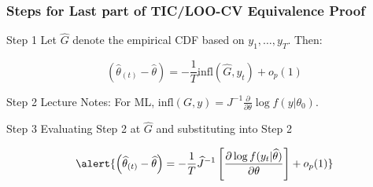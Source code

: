 \begin{frame}
  \frametitle{Steps for Last part of TIC/LOO-CV Equivalence Proof} 
 

  \begin{block}{Step 1}
    Let $\widehat{G}$ denote the empirical CDF based on $y_1, \dots, y_T$. Then:
    \vspace{-1em}

   \[
     \left( \widehat{\theta}_{(t)} - \widehat{\theta} \right) = -\frac{1}{T} \text{infl}(\widehat{G}, y_t) + o_p(1)
   \]
  \end{block}

  \vspace{-1em}

  \begin{block}{Step 2}
    Lecture Notes: For ML, $\text{infl}(G,y) = J^{-1} \frac{\partial}{\partial \theta}\log f(y|\theta_0)$. 
  \end{block}



  \begin{block}{Step 3}
    Evaluating Step 2 at $\widehat{G}$ and substituting into Step 2

    \vspace{-1em}

\[
  \alert{\left( \widehat{\theta}_{(t)} - \widehat{\theta}  \right) = -\frac{1}{T} \widehat{J}^{-1} \left[\frac{\partial \log f(y_t|\widehat{\theta})}{\partial \theta}\right] + o_p(1)}
\]
  \end{block}

\end{frame}
